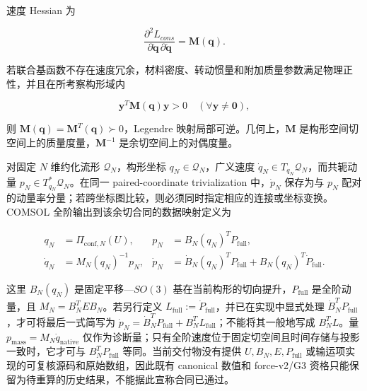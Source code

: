 速度 Hessian 为\cite{MarsdenRatiu1999MechanicsSymmetry,Arnold1989ClassicalMechanics}

\begin{equation}
\label{eq:hamiltonian-3-11}
\frac{\partial^{2}L_{cons}}{\partial\dot{\mathbf{q}}\,\partial\dot{\mathbf{q}}} = \mathbf{M}\left( \mathbf{q} \right).
\end{equation}

若联合基函数不存在速度冗余，材料密度、转动惯量和附加质量参数满足物理正性，并且在所考察构形域内

\begin{equation}
\label{eq:hamiltonian-3-12}
\boxed{\mathbf{y}^{T}\mathbf{M}\left( \mathbf{q} \right)\mathbf{y} > 0\quad\left( \forall\mathbf{y} \neq \mathbf{0} \right),}
\end{equation}

则 \(\mathbf{M}\left( \mathbf{q} \right) = \mathbf{M}^{T}\left( \mathbf{q} \right) \succ 0\)，Legendre 映射局部可逆。几何上，\(\mathbf{M}\) 是构形空间切空间上的质量度量，\(\mathbf{M}^{- 1}\) 是余切空间上的对偶度量。

对固定 \(N\) 维约化流形 \(\mathcal{Q}_{N}\)，构形坐标 \(q_N\in\mathcal{Q}_{N}\)，广义速度 \(\dot q_N\in T_{q_N}\mathcal{Q}_{N}\)，而共轭动量 \(p_N\in T_{q_N}^{*}\mathcal{Q}_{N}\)。在同一 paired-coordinate trivialization 中，\(\dot p_N\) 保存为与 \(p_N\) 配对的动量率分量；若跨坐标图比较，则必须同时指定相应的连接或坐标变换。COMSOL 全阶输出到该余切合同的数据映射定义为

\begin{equation}
\label{eq:hamiltonian-canonical-data-contract}
\boxed{\begin{aligned}
q_N&=\Pi_{\mathrm{conf},N}(U),&
p_N&=B_N(q_N)^{T}P_{\mathrm{full}},\\
\dot q_N&=M_N(q_N)^{-1}p_N,&
\dot p_N&=\dot B_N(q_N)^{T}P_{\mathrm{full}}+B_N(q_N)^{T}\dot P_{\mathrm{full}}.
\end{aligned}}
\end{equation}

这里 \(B_N(q_N)\) 是固定平移---\(SO(3)\) 基在当前构形的切向提升，\(P_{\mathrm{full}}\) 是全阶动量，且 \(M_N=B_N^{T}EB_N\)。若另行定义 \(L_{\mathrm{full}}:=\dot P_{\mathrm{full}}\)，并已在实现中显式处理 \(\dot B_N^{T}P_{\mathrm{full}}\)，才可将最后一式简写为 \(\dot p_N=\dot B_N^{T}P_{\mathrm{full}}+B_N^{T}L_{\mathrm{full}}\)；不能将其一般地写成 \(B_N^{T}L\)。量 \(p_{\mathrm{mass}}=M_N\dot q_{\mathrm{native}}\) 仅作为诊断量；只有全阶速度位于固定切空间且时间存储与投影一致时，它才可与 \(B_N^{T}P_{\mathrm{full}}\) 等同。当前交付物没有提供 \(U,B_N,E,P_{\mathrm{full}}\) 或输运项实现的可复核源码和原始数组，因此既有 canonical 数值和 force-v2/G3 资格只能保留为待重算的历史结果，不能据此宣称合同已通过。


